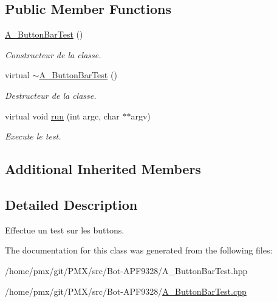 \subsection*{Public Member Functions}
\begin{DoxyCompactItemize}
\item 
\mbox{\label{classA__ButtonBarTest_aa277383a19c49e7c089c14b2b70f5f78}} 
\hyperlink{classA__ButtonBarTest_aa277383a19c49e7c089c14b2b70f5f78}{A\+\_\+\+Button\+Bar\+Test} ()
\begin{DoxyCompactList}\small\item\em Constructeur de la classe. \end{DoxyCompactList}\item 
\mbox{\label{classA__ButtonBarTest_a7cd50ed43f3523bd2b9d30ffebb80c42}} 
virtual \hyperlink{classA__ButtonBarTest_a7cd50ed43f3523bd2b9d30ffebb80c42}{$\sim$\+A\+\_\+\+Button\+Bar\+Test} ()
\begin{DoxyCompactList}\small\item\em Destructeur de la classe. \end{DoxyCompactList}\item 
\mbox{\label{classA__ButtonBarTest_a63c0ce685488028c4cf777c773d1632c}} 
virtual void \hyperlink{classA__ButtonBarTest_a63c0ce685488028c4cf777c773d1632c}{run} (int argc, char $\ast$$\ast$argv)
\begin{DoxyCompactList}\small\item\em Execute le test. \end{DoxyCompactList}\end{DoxyCompactItemize}
\subsection*{Additional Inherited Members}


\subsection{Detailed Description}
Effectue un test sur les buttons. 

The documentation for this class was generated from the following files\+:\begin{DoxyCompactItemize}
\item 
/home/pmx/git/\+P\+M\+X/src/\+Bot-\/\+A\+P\+F9328/A\+\_\+\+Button\+Bar\+Test.\+hpp\item 
/home/pmx/git/\+P\+M\+X/src/\+Bot-\/\+A\+P\+F9328/\hyperlink{A__ButtonBarTest_8cpp}{A\+\_\+\+Button\+Bar\+Test.\+cpp}\end{DoxyCompactItemize}
